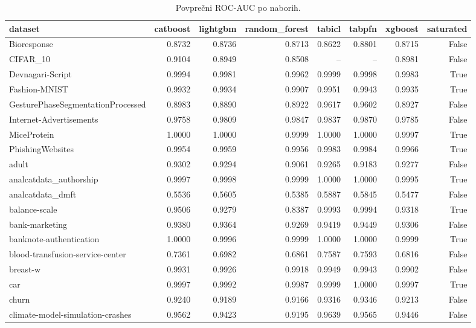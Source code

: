 \begin{table}[htbp]
\centering
\caption{Povprečni ROC-AUC po naborih.}
\label{tab:pivot}
\begin{tabular}{lrrrrrrr}
\hline
dataset & catboost & lightgbm & random\_forest & tabicl & tabpfn & xgboost & saturated \\
\hline
Bioresponse & 0.8732 & 0.8736 & 0.8713 & 0.8622 & 0.8801 & 0.8715 & False \\
CIFAR\_10 & 0.9104 & 0.8949 & 0.8508 & -- & -- & 0.8981 & False \\
Devnagari-Script & 0.9994 & 0.9981 & 0.9962 & 0.9999 & 0.9998 & 0.9983 & True \\
Fashion-MNIST & 0.9932 & 0.9934 & 0.9907 & 0.9951 & 0.9943 & 0.9935 & True \\
GesturePhaseSegmentationProcessed & 0.8983 & 0.8890 & 0.8922 & 0.9617 & 0.9602 & 0.8927 & False \\
Internet-Advertisements & 0.9758 & 0.9809 & 0.9847 & 0.9837 & 0.9870 & 0.9785 & False \\
MiceProtein & 1.0000 & 1.0000 & 0.9999 & 1.0000 & 1.0000 & 0.9997 & True \\
PhishingWebsites & 0.9954 & 0.9959 & 0.9956 & 0.9983 & 0.9984 & 0.9966 & True \\
adult & 0.9302 & 0.9294 & 0.9061 & 0.9265 & 0.9183 & 0.9277 & False \\
analcatdata\_authorship & 0.9997 & 0.9998 & 0.9999 & 1.0000 & 1.0000 & 0.9995 & True \\
analcatdata\_dmft & 0.5536 & 0.5605 & 0.5385 & 0.5887 & 0.5845 & 0.5477 & False \\
balance-scale & 0.9506 & 0.9279 & 0.8387 & 0.9993 & 0.9994 & 0.9318 & True \\
bank-marketing & 0.9380 & 0.9364 & 0.9269 & 0.9419 & 0.9449 & 0.9306 & False \\
banknote-authentication & 1.0000 & 0.9996 & 0.9999 & 1.0000 & 1.0000 & 0.9999 & True \\
blood-transfusion-service-center & 0.7361 & 0.6982 & 0.6861 & 0.7587 & 0.7593 & 0.6816 & False \\
breast-w & 0.9931 & 0.9926 & 0.9918 & 0.9949 & 0.9943 & 0.9902 & False \\
car & 0.9997 & 0.9992 & 0.9987 & 0.9999 & 1.0000 & 0.9997 & True \\
churn & 0.9240 & 0.9189 & 0.9166 & 0.9316 & 0.9346 & 0.9213 & False \\
climate-model-simulation-crashes & 0.9562 & 0.9423 & 0.9195 & 0.9639 & 0.9565 & 0.9446 & False \\

\end{tabular}
\end{table}
